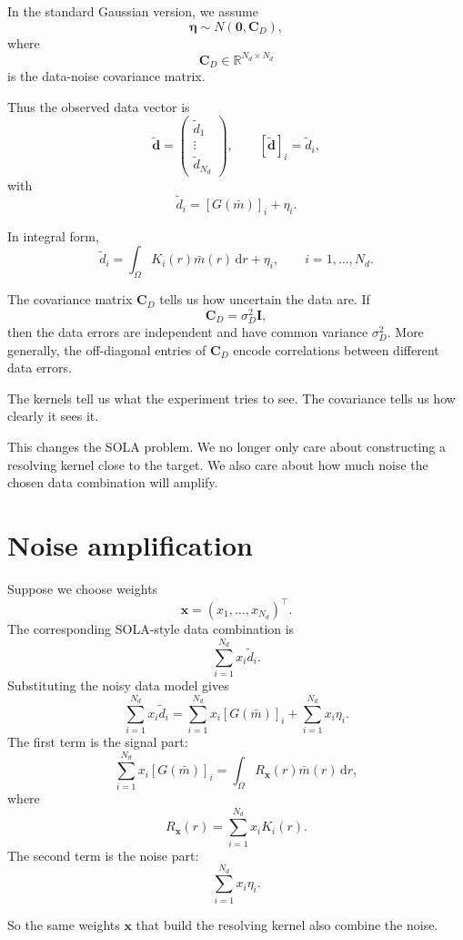 \documentclass[11pt,openany]{book}
\theoremstyle{definition}
\theoremstyle{remark}
\newcommand{\dd}{\,\mathrm d}
\begin{document}
In the standard Gaussian version, we assume
\[
  \boldsymbol\eta\sim N(\mathbf 0,\mathbf C_D),
\]
where
\[
  \mathbf C_D\in\mathbb R^{N_d\times N_d}
\]
is the data-noise covariance matrix.

Thus the observed data vector is
\[
  \widetilde{\mathbf d}
  =
  \begin{pmatrix}
    \widetilde d_1\\
    \vdots\\
    \widetilde d_{N_d}
  \end{pmatrix},
  \qquad
  [\widetilde{\mathbf d}]_i=\widetilde d_i,
\]
with
\[
  \widetilde d_i
  =
  [G(\bar m)]_i+\eta_i.
\]

In integral form,
\[
  \widetilde d_i
  =
  \int_\Omega K_i(r)\bar m(r)\dd r+\eta_i,
  \qquad i=1,\dots,N_d.
\]

The covariance matrix \(\mathbf C_D\) tells us how uncertain the data are. If
\[
  \mathbf C_D=\sigma_D^2\mathbf I,
\]
then the data errors are independent and have common variance \(\sigma_D^2\). More generally,
the off-diagonal entries of \(\mathbf C_D\) encode correlations between different data errors.

\begin{intuitionbox}
The kernels tell us what the experiment tries to see. The covariance tells us how clearly it sees
it.
\end{intuitionbox}

This changes the SOLA problem. We no longer only care about constructing a resolving kernel
close to the target. We also care about how much noise the chosen data combination will amplify.

\section{Noise amplification}

Suppose we choose weights
\[
  \mathbf x=(x_1,\dots,x_{N_d})^\top.
\]
The corresponding SOLA-style data combination is
\[
  \sum_{i=1}^{N_d}x_i\widetilde d_i.
\]
Substituting the noisy data model gives
\[
  \sum_{i=1}^{N_d}x_i\widetilde d_i
  =
  \sum_{i=1}^{N_d}x_i[G(\bar m)]_i
  +
  \sum_{i=1}^{N_d}x_i\eta_i.
\]
The first term is the signal part:
\[
  \sum_{i=1}^{N_d}x_i[G(\bar m)]_i
  =
  \int_\Omega R_{\mathbf x}(r)\bar m(r)\dd r,
\]
where
\[
  R_{\mathbf x}(r)
  =
  \sum_{i=1}^{N_d}x_iK_i(r).
\]
The second term is the noise part:
\[
  \sum_{i=1}^{N_d}x_i\eta_i.
\]

So the same weights \(\mathbf x\) that build the resolving kernel also combine the noise.
\end{document}
